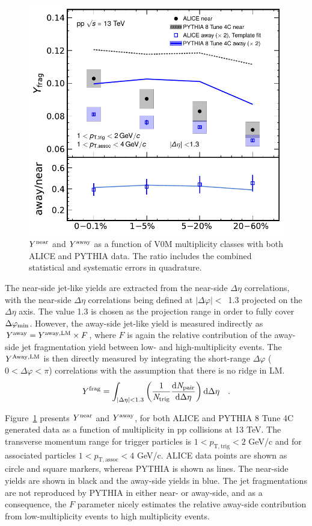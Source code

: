 \begin{figure}[!th]
	\centering
	\includegraphics[width=0.8 \textwidth]{figures/Fig5_Plot_v2Mult.pdf} 
	\caption{$Y^{\rm{near}}$ and $Y^{\rm{away}}$ as a function of V0M multiplicity classes with both ALICE and PYTHIA data. The ratio includes the combined statistical and systematic errors in quadrature.}
	\label{fig:Ymult}
\end{figure}

The near-side jet-like yields are extracted from the near-side $\Delta\eta$ correlations, with the near-side $\Delta\eta$ correlations being defined at $|\Delta\varphi|<$~1.3 projected on the $\Delta\eta$ axis. The value 1.3 is chosen as the projection range in order to fully cover $\Delta\varphi_{\rm{min}}$. However, the away-side jet-like yield is measured indirectly as $Y^{\rm{away}} = Y^{\rm{away, LM}} \times F$, where $F$ is again the relative contribution of the away-side jet fragmentation yield between low- and high-multiplicity events. The $Y^{\rm{Away, LM}}$ is then directly measured by integrating the short-range $\Delta\varphi$ ($0<\Delta\varphi<\pi$) correlations with the assumption that there is no ridge in LM.
\begin{eqnarray}
Y^{\rm{frag}} = \int_{|\Delta \eta|<1.3} \left( \frac{1}{\it{N}_{\rm{trig}}} \frac{ \rm{d}\it{}N_{\rm{pair}} }{ \rm{d}\Delta\eta } \right) \rm{d} \Delta\eta \quad.
\end{eqnarray}

Figure~\ref{fig:Ymult} presents $Y^{\rm{near}}$ and $Y^{\rm{away}}$, for both ALICE and PYTHIA 8 Tune 4C generated data as a function of multiplicity in pp collisions at 13 TeV. The transverse momentum range for trigger particles is $1<p_\mathrm{T,trig}<2$ GeV/c and for associated particles $1<p_\mathrm{T,assoc}<4$ GeV/c. ALICE data points are shown as circle and square markers, whereas PYTHIA is shown as lines. The near-side yields are shown in black and the away-side yields in blue. The jet fragmentations are not reproduced by PYTHIA in either near- or away-side, and as a consequence, the $F$ parameter nicely estimates the relative away-side contribution from low-multiplicity events to high multiplicity events.

